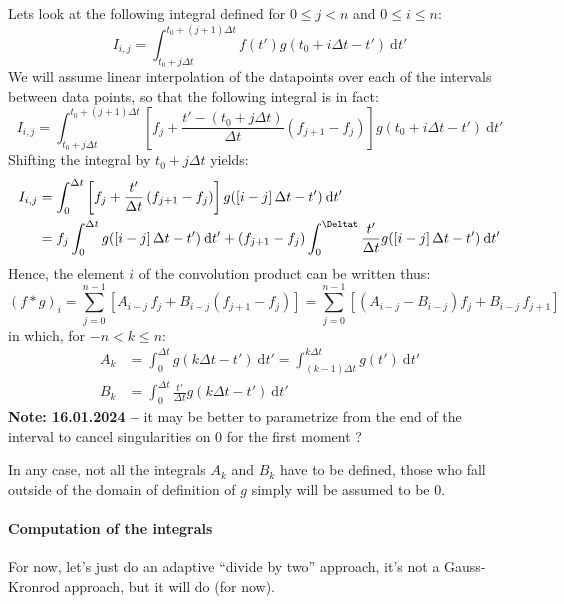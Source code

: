 \documentclass{article}
\newcommand{\dd}{\mathrm{d}}
\newcommand{\pa}[1]{\left(#1\right)}
\newcommand{\pab}[1]{\left[#1\right]}
\newcommand{\obs}[2]{\textbf{Note: #1 --} #2}
\begin{document}
Lets look at the following integral defined for $0\leq j < n$ and $0
\leq i \leq n$:
%
\begin{equation}
  I_{i,j} = 
  \int_{t_0 + j \Delta t}^{t_0 + (j+1) \Delta t}
  f(t') g(t_0 + i\Delta t-t')\:\dd t'
\end{equation}
%
We will assume linear interpolation of the datapoints over each of the
intervals between data points, so that the following integral is in
fact:
%
\begin{equation}
  I_{i,j}  =
\int_{t_0 + j \Delta t}^{t_0 + (j+1) \Delta t}
\pab{f_j + \frac{t' - \pa{t_0 + j \Delta t}}{\Delta t} \pa{f_{j+1} - f_j}}
g(t_0 + i\Delta t-t')\:\dd t'
\end{equation}
%
Shifting the integral by $t_0 + j\Delta t$ yields:
%
\begin{align}
  I_{i,j}  &=
  \int_{0}^{ \Delta t}
  \pab{f_j + \frac{t'}{\Delta t} \pa{f_{j+1} - f_j}}
  g(\pab{i-j}\Delta t -t')\:\dd t'\\
  & = f_j \int_{0}^{\Delta t} g(\pab{i-j}\Delta t -t')\:\dd t'
  + \pa{f_{j+1} - f_j}
  \int_{0}^{\Deltat}
  \frac{t'}{\Delta t} g(\pab{i-j}\Delta t -t')\:\dd t'
\end{align}
%
Hence, the element $i$ of the convolution product can be written thus:
%
\begin{equation}
  (f*g)_i = \sum_{j = 0}^{n-1}
  \pab{
    A_{i-j}\, f_j + B_{i-j}\pa{f_{j+1} - f_j}
  }
  =
  \sum_{j = 0}^{n-1}
  \pab{
    \pa{A_{i-j}- B_{i-j}}f_j + B_{i-j}\,f_{j+1}
  }
\end{equation}
%
in which, for $-n < k \leq n$:
%
\begin{align}
  A_k &= \int_{0}^{\Delta t} g(k\Delta t -t')\:\dd t' =
  \int_{\pa{k-1} \Delta t}^{k \Delta t} g(t') \:\dd t'\\[4mm]
  B_k &= \int_{0}^{\Delta t}
  \frac{t'}{\Delta t} g(k\Delta t - t')\:\dd t'
\end{align}
%
\obs{16.01.2024}{it may be better to parametrize from the end of
  the interval to cancel singularities on 0 for the first moment ?}

In any case, not all the integrals $A_k$ and $B_k$ have to be defined,
those who fall outside of the domain of definition of $g$ simply will
be assumed to be 0.

\paragraph{Computation of the integrals}
For now, let's just do an adaptive ``divide by two'' approach, it's
not a Gauss-Kronrod approach, but it will do (for now).
\end{document}
